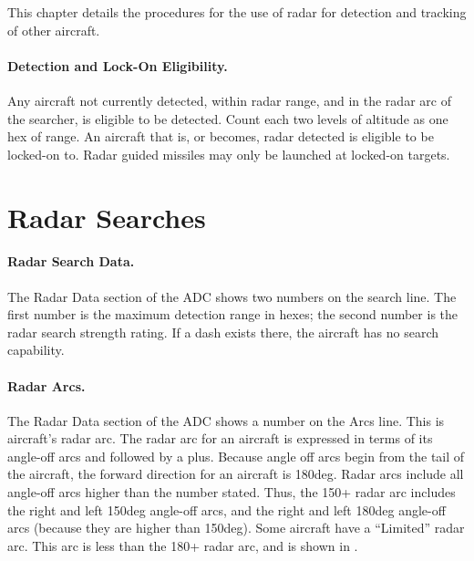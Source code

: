 \label{rule:air-to-air-radar}

This chapter details the procedures for the use of radar for detection and tracking of other aircraft.

\paragraph{Detection and Lock-On Eligibility.} Any aircraft not currently detected, within radar range, and in the radar arc of the searcher, is eligible to be detected. Count each two levels of altitude as one hex of range. An aircraft that is, or becomes, radar detected is eligible to be locked-on to. Radar guided missiles may only be launched at locked-on targets.

\section{Radar Searches}
\label{rule:radar-searches}

\paragraph{Radar Search Data.} The Radar Data section of the ADC shows two numbers on the search line. The first number is the maximum detection range in hexes; the second number is the radar search strength rating. If a dash exists there, the aircraft has no search capability.


\paragraph{Radar Arcs.} The Radar Data section of the ADC shows a number on the Arcs line. This is aircraft's radar arc. The radar arc for an aircraft is expressed in terms of its angle-off arcs and followed by a plus. Because angle off arcs begin from the tail of the aircraft, the forward direction for an aircraft is 180{deg}.  Radar arcs include all angle-off arcs higher than the number stated. Thus, the 150+ radar arc includes the right and left 150{deg} angle-off arcs, and the right and left 180{deg} angle-off arcs (because they are higher than 150{deg}). Some aircraft have a “Limited” radar arc. This arc is less than the 180+ radar arc, and is shown in . 

